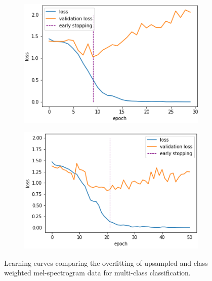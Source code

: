 \documentclass[conference]{IEEEtran}
\begin{document}
\begin{figure}[ht]
\begin{subfigure}[t]{0.24\textwidth}
  \centering
    \includegraphics[width=\textwidth]{Figures/usa_spanish_french_german_mel_hc_upsampled_loss.png}
\end{subfigure}
\begin{subfigure}[t]{0.24\textwidth}
    \centering
    \includegraphics[width=\textwidth]{Figures/usa_spanish_french_german_mel_hc__loss.png}
    \label{fig:loss_curve_weighted}
\end{subfigure}
\caption{Learning curves comparing the overfitting of upsampled and class weighted mel-spectrogram data for multi-class classification.}
\label{fig:curves_mel_upsampled}
\end{figure}
\end{document}
